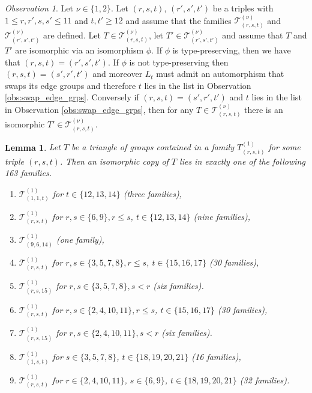 \documentclass[dvipsnames]{article}
\newtheorem{lemma}[theorem]{Lemma}
\theoremstyle{definition}
\theoremstyle{remark}
\newtheorem{observation}[theorem]{Observation}
\begin{document}
    \begin{observation}\label{obs:model_families_isomorphisms}
        Let $\nu \in \{1,2\}$.
        Let $(r,s,t)$, $(r', s', t')$ be a triples with $1\leq r,r',s, s' \leq 11$ and $t,t' \geq 12$ and assume that the families $\mathcal T_{(r,s,t)}^{(\nu)}$ and $\mathcal T_{(r',s',t')}^{(\nu)}$ are defined. 
        Let $T \in \mathcal T_{(r,s,t)}^{(\nu)}$, let $T' \in \mathcal T_{(r',s',t')}^{(\nu)}$ and assume that $T$ and $T'$ are isomorphic via an isomorphism $\phi$. If $\phi$ is type-preserving, then we have that $(r,s,t) = (r',s',t')$. If $\phi$ is not type-preserving then $(r,s,t) = (s',r', t')$ and moreover $L_t$ must admit an automorphism that swaps its edge groups and therefore $t$ lies in the list in Observation \ref{obs:swap_edge_grps}.
        Conversely if $(r,s,t) = (s',r',t')$ and $t$ lies in the list in Observation \ref{obs:swap_edge_grps}, then for any $T \in \mathcal T_{(r,s,t)}^{(\nu)}$ there is an isomorphic $T' \in \mathcal T_{(r,s,t)}^{(\nu)}$.
    \end{observation}

    \begin{lemma}\label{lem:case446}
        Let $T$ be a triangle of groups contained in a family $T_{(r,s,t)}^{(1)}$ for some triple $(r,s,t)$. Then an isomorphic copy of $T$ lies in exactly one of the following 163 families.
        \begin{enumerate}
            \item $\mathcal T_{(1,1,t)}^{(1)}$ for $t \in \{12,13,14\}$ (three families),
            \item $\mathcal T_{(r,s,t)}^{(1)}$ for $r,s \in \{6,9\}, r\leq s$, $t \in \{12,13,14\}$ (nine families),
            \item $\mathcal T_{(9,6,14)}^{(1)}$ (one family),
            \item $\mathcal T_{(r,s,t)}^{(1)}$ for $r,s \in \{3,5,7,8\}, r\leq s$, $t \in \{15,16,17\}$ (30 families),
            \item $\mathcal T_{(r,s,15)}^{(1)}$ for $r,s \in \{3,5,7,8\}, s < r$ (six families).
            \item $\mathcal T_{(r,s,t)}^{(1)}$ for $r,s \in \{2,4,10,11\}, r\leq s$, $t \in \{15,16,17\}$ (30 families),
            \item $\mathcal T_{(r,s,15)}^{(1)}$ for $r,s \in \{2,4,10,11\}, s<r$ (six families).
            \item $\mathcal T_{(1,s,t)}^{(1)}$ for $s \in \{3,5,7,8\}$, $t \in \{18,19,20,21\}$ (16 families),
            \item $\mathcal T_{(r,s,t)}^{(1)}$ for $r\in \{2,4,10,11\}$, $s \in \{6,9\}$, $t \in \{18,19,20,21\}$ (32 families).
        \end{enumerate}
    \end{lemma}
\end{document}
